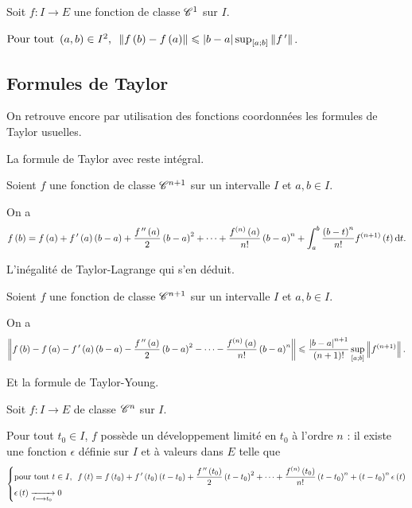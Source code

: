\begin{prop}
Soit \(f:I\to E\) une fonction de classe \(\mathscr{C}^{1}\) sur \(I\).

\(\quantifs{\Tpt\paren{a,b}\in I^2}\norme{f\paren{b}-f\paren{a}}\leq\abs{b-a}\sup_{\intervii{a}{b}}\norme{f\prim}\).
\end{prop}

\subsection{Formules de Taylor}

On retrouve encore par utilisation des fonctions coordonnées les formules de Taylor usuelles.

La formule de Taylor avec reste intégral.

\begin{prop}
Soient \(f\) une fonction de classe \(\mathscr{C}^{n+1}\) sur un intervalle \(I\) et \(a,b\in I\).

On a \[f\paren{b}=f\paren{a}+f\prim\paren{a}\paren{b-a}+\dfrac{f\seconde\paren{a}}{2}\paren{b-a}^2+\dots+\dfrac{f\deriv{n}\paren{a}}{n!}\paren{b-a}^n+\int_a^b\dfrac{\paren{b-t}^n}{n!}f\deriv{n+1}\paren{t}\odif{t}.\]
\end{prop}

L'inégalité de Taylor-Lagrange qui s'en déduit.

\begin{prop}
Soient \(f\) une fonction de classe \(\mathscr{C}^{n+1}\) sur un intervalle \(I\) et \(a,b\in I\).

On a \[\norme{f\paren{b}-f\paren{a}-f\prim\paren{a}\paren{b-a}-\dfrac{f\seconde\paren{a}}{2}\paren{b-a}^2-\dots-\dfrac{f\deriv{n}\paren{a}}{n!}\paren{b-a}^n}\leq\dfrac{\abs{b-a}^{n+1}}{\paren{n+1}!}\sup_{\intervii{a}{b}}\norme{f\deriv{n+1}}.\]
\end{prop}

Et la formule de Taylor-Young.

\begin{prop}
Soit \(f:I\to E\) de classe \(\mathscr{C}^{n}\) sur \(I\).

Pour tout \(t_0\in I\), \(f\) possède un développement limité en \(t_0\) à l'ordre \(n\) : il existe une fonction \(\epsilon\) définie sur \(I\) et à valeurs dans \(E\) telle que \[\begin{dcases}
\quantifs{\tpt t\in I}f\paren{t}=f\paren{t_0}+f\prim\paren{t_0}\paren{t-t_0}+\dfrac{f\seconde\paren{t_0}}{2}\paren{t-t_0}^2+\dots+\dfrac{f\deriv{n}\paren{t_0}}{n!}\paren{t-t_0}^n+\paren{t-t_0}^n\epsilon\paren{t} \\
\epsilon\paren{t}\tendqd{t\to t_0}0
\end{dcases}\]
\end{prop}
